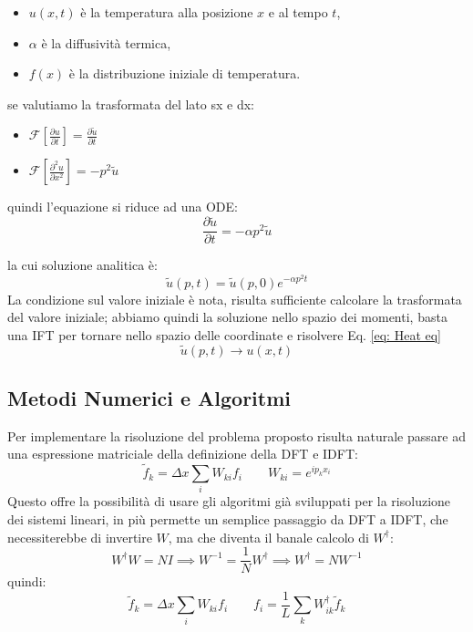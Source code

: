 \begin{itemize}
    \item $u(x, t)$ è la temperatura alla posizione $x$ e al tempo $t$,
    \item $\alpha$ è la diffusività termica,
    \item $f(x)$ è la distribuzione iniziale di temperatura.
\end{itemize}

se valutiamo la trasformata del lato sx e dx:
\begin{itemize}
    \item $\mathcal{F} \left[ \frac{\partial u}{\partial t} \right] = \frac{\partial \tilde{u}}{\partial t}$
    \item $\mathcal{F} \left[ \frac{\partial^2 u}{\partial x^2} \right] = -p^2 \tilde{u}$
\end{itemize}

quindi l'equazione si riduce ad una ODE:
\[
\frac{\partial \tilde{u}}{\partial t} = -\alpha p^2 \tilde{u}
\]

la cui soluzione analitica è:
\[
\tilde{u}(p,t) = \tilde{u}(p,0) e^{-\alpha p^2t}
\]
La condizione sul valore iniziale è nota, risulta sufficiente calcolare la trasformata del valore iniziale; abbiamo quindi la soluzione nello spazio dei momenti, basta una IFT per tornare nello spazio delle coordinate e risolvere Eq. \ref{eq: Heat eq}
\[
\tilde{u}(p,t) \longrightarrow u(x,t)
\]

\subsection{Metodi Numerici e Algoritmi}
Per implementare la risoluzione del problema proposto risulta naturale passare ad una espressione matriciale della definizione della DFT e IDFT:
\[
\tilde{f}_k = \Delta x \sum_{i} W_{ki} f_i \quad \quad W_{ki} = e^{i p_k x_i}
\]
Questo offre la possibilità di usare gli algoritmi già sviluppati per la risoluzione dei sistemi lineari, in più permette un semplice passaggio da DFT a IDFT, che necessiterebbe di invertire $W$, ma che diventa il banale calcolo di $W^\dagger$:
$$W^\dagger W = N I \implies W^{-1} = \frac{1}{N} W^\dagger \implies W^\dagger = N W^{-1}$$
quindi:
\[
\tilde{f}_k = \Delta x \sum_{i} W_{ki} f_i \quad \quad f_i = \frac{1}{L} \sum_{k} W^\dagger_{ik} \tilde{f}_k 
\]

